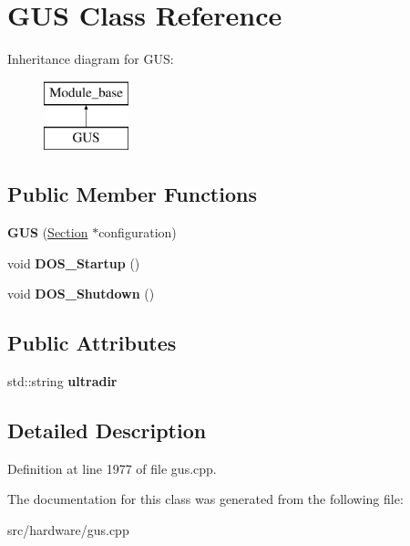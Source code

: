 \hypertarget{classGUS}{\section{G\-U\-S Class Reference}
\label{classGUS}
}
Inheritance diagram for G\-U\-S\-:\begin{figure}[H]
\begin{center}
\leavevmode
\includegraphics[height=2.000000cm]{classGUS}
\end{center}
\end{figure}
\subsection*{Public Member Functions}
\begin{DoxyCompactItemize}
\item 
\hypertarget{classGUS_a4ee14e2fc1aae1aef9cc6306d227dbf2}{{\bfseries G\-U\-S} (\hyperlink{classSection}{Section} $\ast$configuration)}\label{classGUS_a4ee14e2fc1aae1aef9cc6306d227dbf2}

\item 
\hypertarget{classGUS_aeb099ead25e3d56aeb70ecf72a85f14f}{void {\bfseries D\-O\-S\-\_\-\-Startup} ()}\label{classGUS_aeb099ead25e3d56aeb70ecf72a85f14f}

\item 
\hypertarget{classGUS_a36434682ec12dc37bd71575231bf287d}{void {\bfseries D\-O\-S\-\_\-\-Shutdown} ()}\label{classGUS_a36434682ec12dc37bd71575231bf287d}

\end{DoxyCompactItemize}
\subsection*{Public Attributes}
\begin{DoxyCompactItemize}
\item 
\hypertarget{classGUS_a3f1bfc9fabf97294cd24f1631368729a}{std\-::string {\bfseries ultradir}}\label{classGUS_a3f1bfc9fabf97294cd24f1631368729a}

\end{DoxyCompactItemize}


\subsection{Detailed Description}


Definition at line 1977 of file gus.\-cpp.



The documentation for this class was generated from the following file\-:\begin{DoxyCompactItemize}
\item 
src/hardware/gus.\-cpp\end{DoxyCompactItemize}
